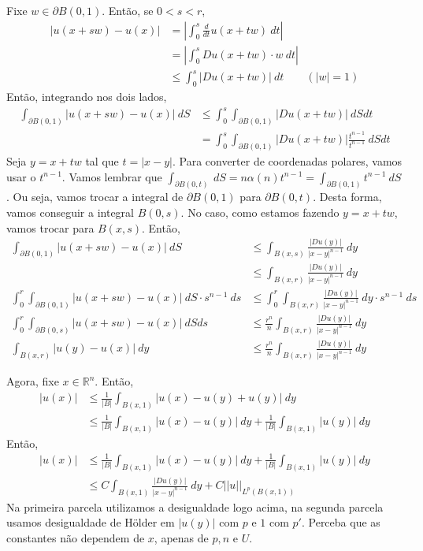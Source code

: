 \documentclass[11pt]{article}
\newcommand{\Rn}{{\mathbb{R}^n}}
\newcommand{\p}{\partial}
\begin{document}
Fixe $w \in \p B(0,1)$. Então, se $0 < s < r$, \begin{align*}
	| u(x+sw) - u(x) | &= \left| \int_0^s \frac{d}{dt}u(x + tw)\ dt \right| \\
	&= \left| \int_0^s Du(x+tw)\cdot w \ dt\right| \\
	& \leq \int_0^s \left| Du(x+tw) \right| \ dt \qquad (|w|=1)
\end{align*} Então, integrando nos dois lados,
\begin{align*}
	\int_{\p B(0,1)} | u(x+sw) - u(x) |\ dS &\leq \int_0^s \int_{\p B(0,1)}  \left| Du(x+tw) \right| \ dS dt \\
	&= \int_0^s \int_{\p B(0,1)}  \left| Du(x+tw) \right| \frac{t^{n-1}}{t^{n-1}} \ dS dt 
\end{align*} Seja $y=x+tw$ tal que $t = |x-y|$. Para converter de coordenadas polares, vamos usar o $t^{n-1}$. Vamos lembrar que $\int_{\p B(0,t)}\ dS = n \alpha(n) t^{n-1} = \int_{\p B(0,1)} t^{n-1}\ dS$. Ou seja, vamos trocar a integral de $\p B(0,1)$ para $\p B(0,t)$. Desta forma, vamos conseguir a integral $B(0,s)$. No caso, como estamos fazendo $y=x+tw$, vamos trocar para $B(x,s)$. Então, \begin{align*}
\int_{\p B(0,1)} | u(x+sw) - u(x) |\ dS &\leq \int_{B(x,s)} \frac{|Du(y)|}{|x-y|^{n-1}}\ dy \\
&\leq \int_{B(x,r)} \frac{|Du(y)|}{|x-y|^{n-1}}\ dy \\
\int_0^r \int_{\p B(0,1)} | u(x+sw) - u(x) |\ dS \cdot s^{n-1}\ ds &\leq \int_0^r \int_{B(x,r)} \frac{|Du(y)|}{|x-y|^{n-1}}\ dy \cdot s^{n-1}\ ds\\
\int_0^r \int_{\p B(0,s)} | u(x+sw) - u(x) |\ dS ds &\leq \frac{r^n}{n} \int_{B(x,r)} \frac{|Du(y)|}{|x-y|^{n-1}}\ dy  \\
\int_{ B(x,r)} | u(y) - u(x) |\ dy &\leq \frac{r^n}{n} \int_{B(x,r)} \frac{|Du(y)|}{|x-y|^{n-1}}\ dy 
\end{align*}

Agora, fixe $x \in \Rn$. Então, \begin{align*}
	|u(x)| &  \leq \frac{1}{|B|}\int_{B(x,1)}|u(x) - u(y) + u(y)| \ dy \\
	  &\leq \frac{1}{|B|}\int_{B(x,1)} |u(x) - u(y)| \ dy + \frac{1}{|B|}\int_{B(x,1)}| u(y) |\ dy 
\end{align*}
Então, \begin{align*}
	|u(x)| &\leq \frac{1}{|B|}\int_{B(x,1)} |u(x) - u(y)| \ dy + \frac{1}{|B|}\int_{B(x,1)}| u(y) |\ dy \\
	&\leq C\int_{B(x,1)} \frac{|Du(y)|}{|x-y|^{n-1}}\ dy + C ||u||_{L^p(B(x,1))}
\end{align*}
Na primeira parcela utilizamos a desigualdade logo acima, na segunda parcela usamos desigualdade de Hölder em $|u(y)|$ com $p$ e $1$ com $p'$. Perceba que as constantes não dependem de $x$, apenas de $p, n$ e $U$.
\end{document}
